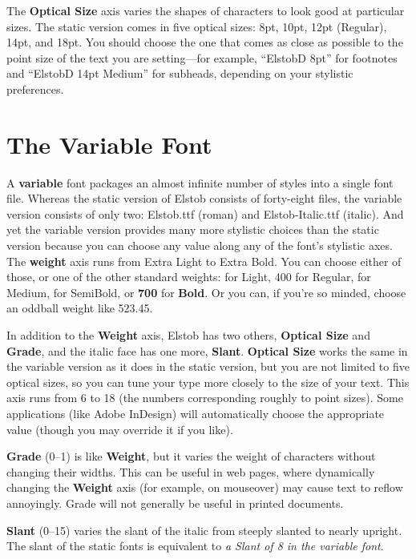 \documentclass[12pt,letterpaper,openany]{book}
\begin{document}
The \textbf{Optical Size} axis varies the shapes of characters to look good at
particular sizes. The static version comes in five optical sizes: 8pt, 10pt,
12pt (Regular), 14pt, and 18pt. You should choose the one that comes as close
as possible to the point size of the text you are setting---for example, “ElstobD
8pt” for footnotes and “ElstobD 14pt Medium” for subheads, depending on your
stylistic preferences.

\section{The Variable Font}

A \textbf{variable} font packages an almost infinite number
of styles into a single font file. Whereas the static version of Elstob consists
of forty-eight files, the variable version consists of only two: Elstob.ttf
(roman) and Elstob-Italic.ttf (italic). And yet the variable version provides
many more stylistic choices than the static version because you can choose any
value along any of the font’s stylistic axes. The \textbf{weight} axis
runs from { Extra Light} to { Extra Bold}. You
can choose either of those, or one of the other standard weights: {} for
{\light Light}, 400 for Regular, {} for {\medium Medium},
{} for {\semibold SemiBold}, or \textbf{700} for \textbf{Bold}.
Or you can, if you're so minded, choose {\oddball an oddball weight like
523.45}.

In addition to the \textbf{Weight} axis, Elstob has two others, \textbf{Optical
Size} and \textbf{Grade}, and the italic face has one more, \textbf{Slant}.
\textbf{Optical Size} works the same in the variable version as it does in the
static version, but you are not limited to five optical sizes, so you can tune
your type more closely to the size of your text. This axis runs from 6 to
18 (the numbers corresponding roughly to point sizes). Some applications (like
Adobe InDesign) will automatically
choose the appropriate value (though you may override it if you like).

\textbf{Grade}
(0--1) is like \textbf{Weight}, but it varies the weight of characters without changing
their widths. This can be useful in web pages, where dynamically changing the
\textbf{Weight} axis (for example, on mouseover) may cause text to reflow annoyingly. Grade will
not generally be useful in printed documents.

\textbf{Slant} (0--15) varies
the slant of the italic from { steeply slanted} to { nearly upright}. The slant of the static fonts is
equivalent to \textit{a Slant of 8 in the variable font}.
\end{document}
